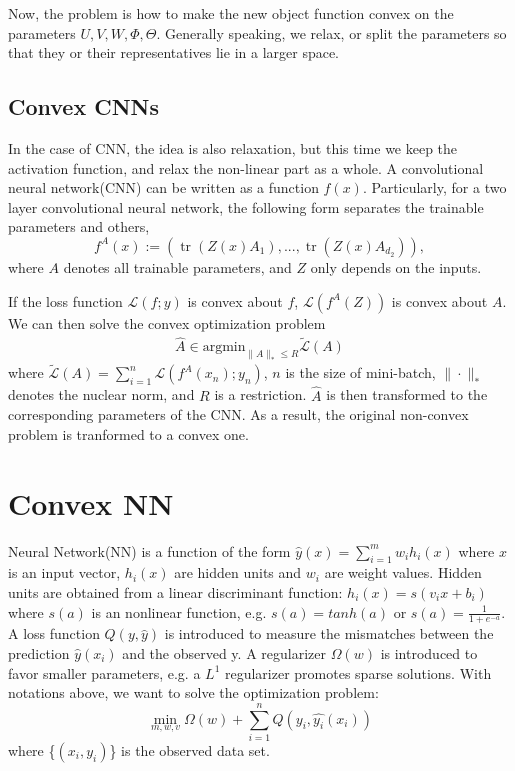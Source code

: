 \documentclass{article}
\DeclareMathOperator{\tr}{tr}
\begin{document}
Now, the problem is how to make the new object function convex on the parameters $U,V,W,\Phi,\Theta$. Generally speaking, we relax, or split the parameters so that they or their representatives lie in a larger space.

\subsection{Convex CNNs}
In the case of CNN, the idea is also relaxation, but this time we keep the activation function, and relax the non-linear part as a whole. A convolutional neural network(CNN) can be written as a function $f(x)$. Particularly, for a two layer convolutional neural network, the following form separates the trainable parameters and others,
\[f^A(x):=(\tr(Z(x)A_1),...,\tr(Z(x)A_{d_2})),\]
where $A$ denotes all trainable parameters, and $Z$ only depends on the inputs.

If the loss function $\mathcal{L}(f;y)$ is convex about $f$, $\mathcal{L}(f^A(Z))$ is convex about $A$. We can then solve the convex optimization problem
\begin{align*}
\widehat{A}\in\text{argmin}_{\|A\|_*\leq R}\tilde{\mathcal{L}}(A)
\end{align*}
where $\tilde{\mathcal{L}}(A)=\sum_{i=1}^n\mathcal{L}(f^A(x_n);y_n)$, $n$ is the size of mini-batch, $\|\cdot\|_*$ denotes the nuclear norm, and $R$ is a restriction. $\widehat{A}$ is then transformed to the corresponding parameters of the CNN. As a result, the original non-convex problem is tranformed to a convex one.
\section{Convex NN}
Neural Network(NN) is a function of the form $\hat{y}(x) = \sum_{i=1}^{m} w_{i} h_{i}(x)$ where $x$ is an input vector, $h_{i}(x)$ are hidden units and $w_{i}$ are weight values. Hidden units are obtained from a linear discriminant function: $h_{i}(x) = s(v_{i}x+b_{i})$ where $s(a)$ is an nonlinear function, e.g. $s(a) = tanh(a)$ or $s(a) = \frac{1}{1+e^{-a}}$. A loss function $Q(y,\hat{y})$ is introduced to measure the mismatches between the prediction $\hat{y}(x_{i})$ and the observed y. A regularizer $\Omega(w)$ is introduced to favor smaller parameters, e.g. a $L^{1}$ regularizer promotes sparse solutions. With notations above, we want to solve the optimization problem:
\begin{equation}
\min_{m,w,v} \Omega(w) + \sum_{i=1}^{n}Q(y_{i},\hat{y_{i}}(x_{i})) 
\end{equation}
where \{$(x_{i},y_{i})$\} is the observed data set. 
\end{document}
